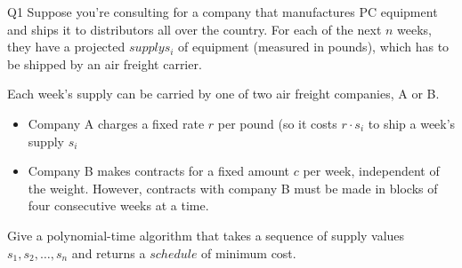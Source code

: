 \begin{problem}
  {Q1}
  Suppose you're consulting for a company that manufactures PC equipment and ships it to distributors all over the country.
  For each of the next $n$ weeks, they have a projected $supply s_i$ of equipment (measured in pounds), which has to be shipped
  by an air freight carrier.

  Each week's supply can be carried by one of two air freight companies, A or B.
  \begin{itemize}
    \item Company A charges a fixed rate $r$ per pound (so it costs $r \cdot s_i$ to ship a week's supply $s_i$
    \item Company B makes contracts for a fixed amount $c$ per week, independent of the weight.
          However, contracts with company B must be made in blocks of four consecutive weeks at a time.
  \end{itemize}
  Give a polynomial-time algorithm that takes a sequence of supply values $s_1, s_2, \dots, s_n$ and returns a $schedule$ of minimum cost.
\end{problem}
